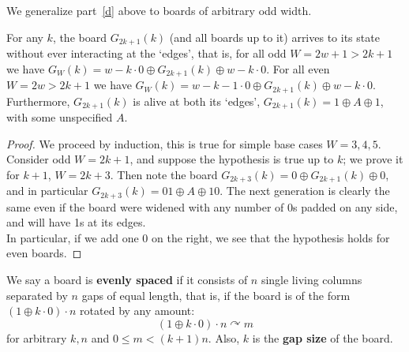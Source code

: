 \documentclass[12pt,letterpaper]{article}
\begin{document}
\noindent We generalize part~\ref{d} above to boards of arbitrary odd width.
\begin{prop}\label{OddBoardFirstEdge} %
  For any $k$, the board $G_{2k+1}(k)$ (and all boards up to it) arrives to its state without ever interacting at the `edges', that is, for all odd $W=2w+1>2k+1$ we have $G_W(k) = w-k \cdot 0 \oplus G_{2k+1}(k)\oplus w-k\cdot 0$. For all even $W=2w>2k+1$ we have $G_W(k) = w-k-1\cdot 0 \oplus G_{2k+1}(k)\oplus w-k\cdot 0$. \\
  Furthermore, $G_{2k+1}(k)$ is alive at both its `edges', $G_{2k+1}(k)=1\oplus A\oplus 1$, with some unspecified $A$.
\end{prop}
\begin{proof}
  
  We proceed by induction, this is true for simple base cases $W=3,4,5$. Consider odd $W=2k+1$, and suppose the hypothesis is true up to $k$; we prove it for $k+1$, $W=2k+3$. Then note the board $G_{2k+3}(k)=0\oplus G_{2k+1}(k)\oplus 0$, and in particular $G_{2k+3}(k)=01\oplus A\oplus 10$. The next generation is clearly the same even if the board were widened with any number of 0s padded on any side, and will have 1s at its edges. \\
  In particular, if we add one 0 on the right, we see that the hypothesis holds for even boards.
\end{proof}

\begin{dfn}\label{EvenlySpaced}
  We say a board is {\bf evenly spaced} if it consists of $n$ single living columns separated by $n$ gaps of equal length, that is, if the board is of the form $(1\oplus k\cdot 0)\cdot n$ rotated by any amount:
  \[(1\oplus k\cdot 0)\cdot n \curvearrowright m \]
  for arbitrary $k,n$ and $0\leq m < (k+1)n$. Also, $k$ is the {\bf gap size} of the board. 
\end{dfn}
\end{document}
